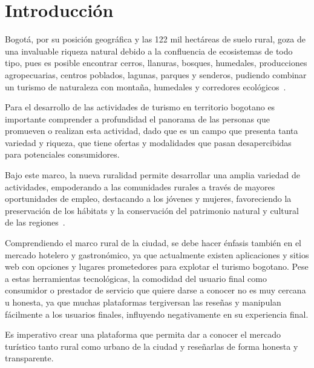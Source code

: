 \section{Introducción}
Bogotá, por su posición geográfica y las 122 mil hectáreas de suelo rural, goza de una invaluable riqueza natural debido a la confluencia de ecosistemas de todo tipo, pues es posible encontrar cerros, llanuras, bosques, humedales, producciones agropecuarias, centros poblados, lagunas, parques y senderos, pudiendo combinar un turismo de naturaleza con montaña, humedales y corredores ecológicos~\cite{EstudioTurismoenterritoriosruralesdeBogotá}.

Para el desarrollo de las actividades de turismo en territorio bogotano es importante comprender a profundidad el panorama de las personas que promueven o realizan esta actividad, dado que es un campo que presenta tanta variedad y riqueza, que tiene ofertas y modalidades que pasan desapercibidas para potenciales consumidores.

Bajo este marco, la nueva ruralidad permite desarrollar una amplia variedad de actividades, empoderando a las comunidades rurales a través de mayores oportunidades de empleo, destacando a los jóvenes y mujeres, favoreciendo la preservación de los hábitats y la conservación del patrimonio natural y cultural de las regiones~\cite{EstudioTurismoenterritoriosruralesdeBogotá}.

Comprendiendo el marco rural de la ciudad, se debe hacer énfasis también en el mercado hotelero y gastronómico, ya que actualmente existen aplicaciones y sitios web con opciones y lugares prometedores para explotar el turismo bogotano. Pese a estas herramientas tecnológicas, la comodidad del usuario final como consumidor o prestador de servicio que quiere darse a conocer no es muy cercana u honesta, ya que muchas plataformas tergiversan las reseñas y manipulan fácilmente a los usuarios finales, influyendo negativamente en su experiencia final.

Es imperativo crear una plataforma que permita dar a conocer el mercado turístico tanto rural como urbano de la ciudad y reseñarlas de forma honesta y transparente.
